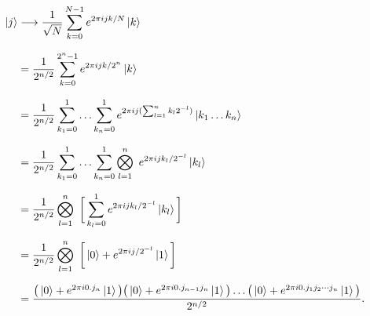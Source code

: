 \documentclass[a4paper]{article}
\begin{document}
    \begin{equation} \label{eq3}
    \setlength{\jot}{10pt}
    \begin{aligned}
        \ket{j} &\longrightarrow \frac{1}{\sqrt{N}} \sum_{k=0}^{N-1} e^{2 \pi i j k / N} \ket{k} \\
            &= \frac{1}{2^{n/2}}   \sum_{k=0}^{2^n-1}   e^{2 \pi i j k / 2^n}   \ket{k} \\
            &= \frac{1}{2^{n/2}}    \sum_{k_1 = 0}^{1} \dotso \sum_{k_n = 0}^{1}   e^{2 \pi i j (\sum_{l=1}^{n} k_l 2^{-l})}   \ket{k_1 \dotso k_n} \\
            &= \frac{1}{2^{n/2}}    \sum_{k_1 = 0}^{1} \dotso \sum_{k_n = 0}^{1}   \bigotimes_{l = 1}^{n} \   e^{2 \pi i j k_l / 2^{-l}}   \ket{k_l} \\
            &= \frac{1}{2^{n/2}}    \bigotimes_{l = 1}^{n} \   \bigg[ \sum_{k_l = 0}^{1}   e^{2 \pi i j k_l / 2^{-l}}   \ket{k_l} \bigg] \\
            &= \frac{1}{2^{n/2}}    \bigotimes_{l = 1}^{n} \   \bigg[ \ket{0} + e^{2 \pi i j / 2^{-l}} \ket{1} \bigg] \\
            &= \frac { \big( \ket{0} + e^{2 \pi i 0.j_n} \ket{1} \big)   \big( \ket{0} + e^{2 \pi i 0.j_{n-1} j_n} \ket{1} \big)   \dotso   \big( \ket{0} + e^{2 \pi i 0.j_1 j_2 \cdots j_n} \ket{1} \big) } {2^{n/2}}.
    \end{aligned}
    \end{equation}
\end{document}
